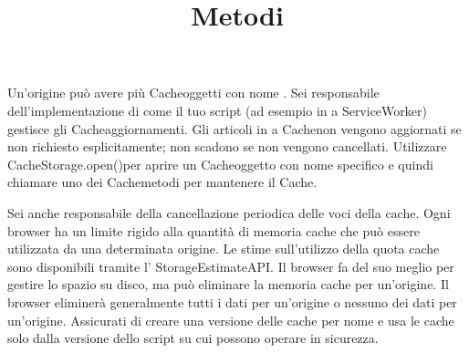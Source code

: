 \documentclass[italian]{article}
\begin{document}
Un'origine può avere più Cacheoggetti con nome . Sei responsabile dell'implementazione di come il tuo script (ad esempio in a ServiceWorker) gestisce gli Cacheaggiornamenti. Gli articoli in a Cachenon vengono aggiornati se non richiesto esplicitamente; non scadono se non vengono cancellati. Utilizzare CacheStorage.open()per aprire un Cacheoggetto con nome specifico e quindi chiamare uno dei Cachemetodi per mantenere il Cache.

Sei anche responsabile della cancellazione periodica delle voci della cache. Ogni browser ha un limite rigido alla quantità di memoria cache che può essere utilizzata da una determinata origine. Le stime sull'utilizzo della quota cache sono disponibili tramite l' StorageEstimateAPI. Il browser fa del suo meglio per gestire lo spazio su disco, ma può eliminare la memoria cache per un'origine. Il browser eliminerà generalmente tutti i dati per un'origine o nessuno dei dati per un'origine. Assicurati di creare una versione delle cache per nome e usa le cache solo dalla versione dello script su cui possono operare in sicurezza.
\title{\textbf{Metodi}}
\end{document}
